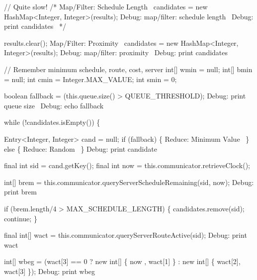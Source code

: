     // Quite slow!
    /*
    \LA{}Map/Filter: Schedule Length~{\nwtagstyle{}}\RA{}
    candidates = new HashMap<Integer, Integer>(results);
    \LA{}Debug: map/filter: schedule length~{\nwtagstyle{}}\RA{}
    \LA{}Debug: print candidates~{\nwtagstyle{}}\RA{}
    */

    results.clear();
    \LA{}Map/Filter: Proximity~{\nwtagstyle{}}\RA{}
    candidates = new HashMap<Integer, Integer>(results);
    \LA{}Debug: map/filter: proximity~{\nwtagstyle{}}\RA{}
    \LA{}Debug: print candidates~{\nwtagstyle{}}\RA{}

    // Remember minimum schedule, route, cost, server
    int[] wmin = null;
    int[] bmin = null;
    int cmin = Integer.MAX_VALUE;
    int smin = 0;

    boolean fallback = (this.queue.size() > QUEUE_THRESHOLD);
    \LA{}Debug: print queue size~{\nwtagstyle{}}\RA{}
    \LA{}Debug: echo fallback~{\nwtagstyle{}}\RA{}

    while (!candidates.isEmpty()) \{

      Entry<Integer, Integer> cand = null;
      if (fallback) \{
        \LA{}Reduce: Minimum Value~{\nwtagstyle{}}\RA{}
      \} else \{
        \LA{}Reduce: Random~{\nwtagstyle{}}\RA{}
      \}
      \LA{}Debug: print candidate~{\nwtagstyle{}}\RA{}

      final int sid = cand.getKey();
      final int now = this.communicator.retrieveClock();

      int[] brem = this.communicator.queryServerScheduleRemaining(sid, now);
      \LA{}Debug: print brem~{\nwtagstyle{}}\RA{}

      if (brem.length/4 > MAX_SCHEDULE_LENGTH) \{
        candidates.remove(sid);
        continue;
      \}

      final int[] wact = this.communicator.queryServerRouteActive(sid);
      \LA{}Debug: print wact~{\nwtagstyle{}}\RA{}

      int[] wbeg = (wact[3] == 0
          ? new int[] \{ now    , wact[1] \}
          : new int[] \{ wact[2], wact[3] \});
      \LA{}Debug: print wbeg~{\nwtagstyle{}}\RA{}

